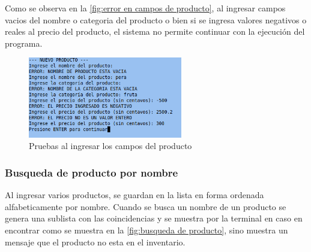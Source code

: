 \documentclass[12pt]{article}
\begin{document}
Como se observa en la \autoref{fig:error en campos de producto}, al ingresar campos vacios del nombre o categoria del producto o bien si se 
ingresa valores negativos o reales al precio del producto, el sistema no permite continuar con la ejecución del programa.

\begin{figure}[H]
	\centering
	\setlength{\fboxrule}{0pt}
	\includegraphics[width=0.6\textwidth]{Imagenes/img9.png}
	\caption{Pruebas al ingresar los campos del producto}
	\label{fig:error en campos de producto}
\end{figure} 

\subsubsection{Busqueda de producto por nombre}

Al ingresar varios productos, se guardan en la lista en forma ordenada alfabeticamente por nombre. Cuando se busca un nombre de un producto
se genera una sublista con las coincidencias y se muestra por la terminal en caso en encontrar como se muestra en la \autoref{fig:busqueda de producto}, sino muestra un mensaje que el producto no esta en el inventario.
\end{document}
